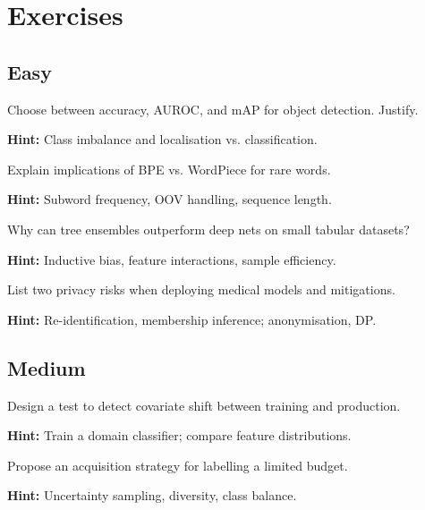 
\section*{Exercises}

\subsection*{Easy}

\begin{problem}
Choose between accuracy, AUROC, and mAP for object detection. Justify.

\textbf{Hint:} Class imbalance and localisation vs. classification.
\end{problem}

\begin{problem}
Explain implications of BPE vs. WordPiece for rare words.

\textbf{Hint:} Subword frequency, OOV handling, sequence length.
\end{problem}

\begin{problem}
Why can tree ensembles outperform deep nets on small tabular datasets?

\textbf{Hint:} Inductive bias, feature interactions, sample efficiency.
\end{problem}

\begin{problem}
List two privacy risks when deploying medical models and mitigations.

\textbf{Hint:} Re-identification, membership inference; anonymisation, DP.
\end{problem}

\subsection*{Medium}

\begin{problem}
Design a test to detect covariate shift between training and production.

\textbf{Hint:} Train a domain classifier; compare feature distributions.
\end{problem}

\begin{problem}
Propose an acquisition strategy for labelling a limited budget.

\textbf{Hint:} Uncertainty sampling, diversity, class balance.
\end{problem}

